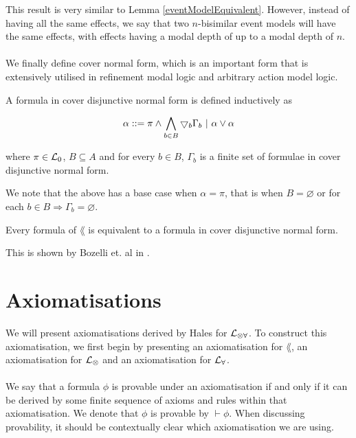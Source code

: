This result is very similar to Lemma \ref{eventModelEquivalent}.
However, instead of having all the same effects, we say that two $n$-bisimilar event models will
have the same effects, with effects having a modal depth of up to a modal depth of $n$.\\
\\
We finally define cover normal form, which is an important form that is extensively utilised in
refinement modal logic and arbitrary action model logic.

\begin{defn} \label{coverNormal}
A formula in cover disjunctive normal form is defined inductively as

\[
	\alpha ::= \pi \land \bigwedge_{b \in B} \bigtriangledown_b \Gamma_b \text{ } | \text{ } \alpha \lor \alpha
\]

where $\pi \in \mathcal{L}_0$, $B \subseteq A$ and for every $b \in B$, $\Gamma_b$ is a finite set of
formulae in cover disjunctive normal form.
\end{defn}

We note that the above has a base case when $\alpha = \pi$, that is when $B = \varnothing$ or for
each $b \in B \Rightarrow \Gamma_b = \varnothing$.

\begin{lemma} \label{allInCoverNormal}
Every formula of $\lang$ is equivalent to a formula in cover disjunctive normal form.
\end{lemma}

This is shown by Bozelli et. al in \cite{DBLPjournalscorrabs12023538}.

\section{Axiomatisations}
We will present axiomatisations derived by Hales for $\mathcal{L}_{\otimes\forall}$.
To construct this axiomatisation, we first begin by presenting an axiomatisation for $\lang$, an
axiomatisation for $\mathcal{L}_{\otimes}$ and an axiomatisation for $\mathcal{L}_{\forall}$.\\
\\
We say that a formula $\phi$ is provable under an axiomatisation if and only if it can be derived by
some finite sequence of axioms and rules within that axiomatisation.
We denote that $\phi$ is provable by $\vdash \phi$.
When discussing provability, it should be contextually clear which axiomatisation we are using.

